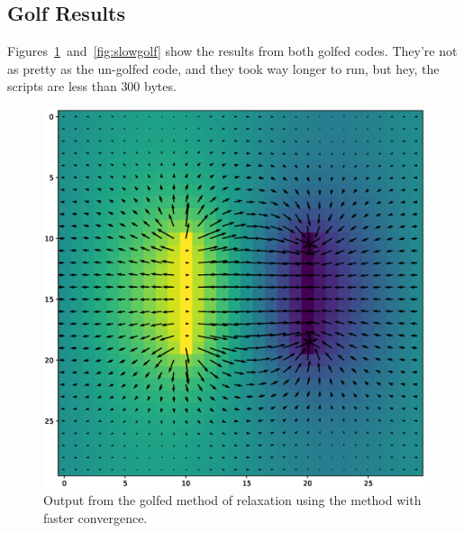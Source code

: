 \documentclass[12pt,twocolumn]{article}
\begin{document}
\subsection{Golf Results}
Figures~\ref{fig:fastgolf}~and~\ref{fig:slowgolf} show the results from both golfed codes. They're not as pretty as the un-golfed code, and they took way longer to run, but hey, the scripts are less than $300$ bytes.
\begin{figure}
\includegraphics[width=\linewidth]{FastGolf.eps}
\caption{Output from the golfed method of relaxation using the method with faster convergence.}
\label{fig:fastgolf}
\end{figure}
\end{document}

